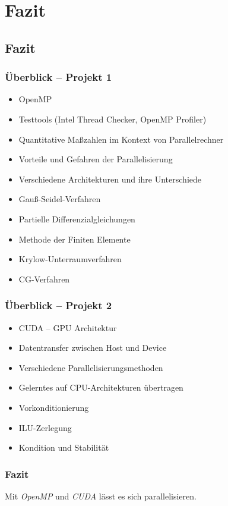 \documentclass[german,notes,18pt]{beamer}
\begin{document}
	
	\section{Fazit}
	\subsection{Fazit}

	\begin{frame}
		\frametitle{Überblick -- Projekt 1}
		\begin{itemize}
			\item OpenMP
			\item Testtools (Intel Thread Checker, OpenMP Profiler)
			\item Quantitative Maßzahlen im Kontext von Parallelrechner
			\item Vorteile und Gefahren der Parallelisierung
			\item Verschiedene Architekturen und ihre Unterschiede
			\item Gauß-Seidel-Verfahren
			\item Partielle Differenzialgleichungen
			\item Methode der Finiten Elemente
			\item Krylow-Unterraumverfahren
			\item CG-Verfahren
		\end{itemize}		

	\end{frame}


	\begin{frame}
		\frametitle{Überblick -- Projekt 2}
		\begin{itemize}
			\item CUDA -- GPU Architektur
			\item Datentransfer zwischen Host und Device
			\item Verschiedene Parallelisierungsmethoden
			\item Gelerntes auf CPU-Architekturen übertragen
			\item Vorkonditionierung
			\item ILU-Zerlegung
			\item Kondition und Stabilität
		\end{itemize}		

	\end{frame}

	\begin{frame}
		\frametitle{Fazit}
		
		\LARGE
		\centering
		Mit \emph{OpenMP} und \emph{CUDA} lässt es sich parallelisieren.
	\end{frame}
\end{document}
